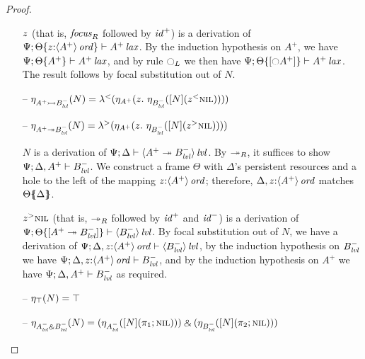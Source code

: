 \begin{proof}
\begin{itemize}
$\tfocusr{z}$ (that is, ${\it focus}_R$ followed by ${\it id}^+$) is
a derivation of 
$\foc{\Psi}{\tackon{\Theta}{z{:}\istrue{\susp{A^+}}}}{\islax{A^+}}$. 
By the induction hypothesis on $A^+$, we have
$\foc{\Psi}{\tackon{\Theta}{A^+}}{\islax{A^+}}$, and 
by rule ${\ocircle}_L$ we then have
$\foc{\Psi}{\tackon{\Theta}{[{\ocircle}A^+]}}{\islax{A^+}}$.
The result follows by focal substitution out of $N$.
\smallskip

\item[--] $\etana{N}{A^+ \lefti B^-_\mlvl}
           = \tlaml{(\etapa{z}{~\etana{[N](\tappl{z}{\tnil})}{B^-_\mlvl}}{A^+})}$
\item[--] $\etana{N}{A^+ \righti B^-_\mlvl}
           = \tlamr{(\etapa{z}{~\etana{[N](\tappr{z}{\tnil})}{B^-_\mlvl}}{A^+})}$
\smallskip

$N$ is a derivation of 
$\foc{\Psi}{\Delta}{\islvl{\susp{A^+ \righti B^-_\mlvl}}}$. By 
${\righti}_R$, it suffices to show $\foc{\Psi}{\Delta, A^+}{B^-_\mlvl}$.
We construct a frame $\Theta$ with $\Delta$'s persistent resources and 
a hole to the left of the mapping $z{:}\istrue{\susp{A^+}}$; therefore,
$\mkconj{\Delta}{z{:}\istrue{\susp{A^+}}}$ matches 
$\frameoff{\Theta}{\Delta}$.



$\tappr{z}{\tnil}$ (that is, ${\righti}_R$ followed by ${\it id}^+$ and
${\it id}^-$) is a derivation of 
$\foc{\Psi}{\tackon{\Theta}{[A^+ \righti B^-_\mlvl]}}{\islvl{\susp{B^-_\mlvl}}}$.
By focal substitution out of $N$, we have a derivation of 
$\foc{\Psi}{\Delta, z{:}\istrue{\susp{A^+}}}{\islvl{\susp{B^-_\mlvl}}}$,
by the induction hypothesis on $B^-_\mlvl$ we have
$\foc{\Psi}{\Delta, z{:}\istrue{\susp{A^+}}}{B^-_\mlvl}$, and
by the induction hypothesis on $A^+$ we have
$\foc{\Psi}{\Delta, A^+}{B^-_\mlvl}$ as required.

\smallskip

\item[--] $\etana{N}{\top} = \top$ 
\item[--] $\etana{N}{A^-_\mlvl \with B^-_\mlvl}
           = \twithr
              {(\etana{[N](\tpione{\tnil})}{A^-_\mlvl})}
              {(\etana{[N](\tpitwo{\tnil})}{B^-_\mlvl})}$
\smallskip


\end{itemize}
\end{proof}
